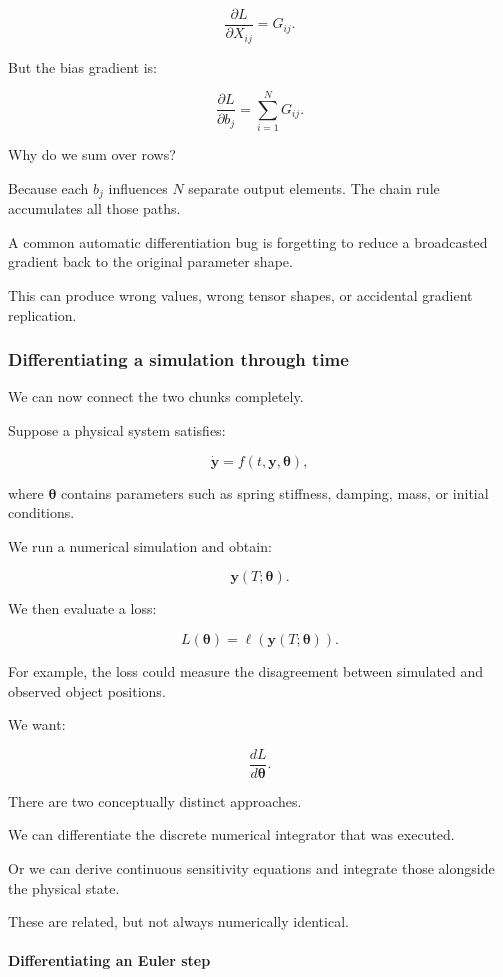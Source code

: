 \[
\frac{\partial L}{\partial X_{ij}}=G_{ij}.
\]

But the bias gradient is:

\[
\boxed{ \frac{\partial L}{\partial b_j} = \sum_{i=1}^{N}G_{ij} }.
\]

Why do we sum over rows?

Because each \(b_j\) influences \(N\) separate output elements. The chain rule accumulates all those paths.

A common automatic differentiation bug is forgetting to reduce a broadcasted gradient back to the original parameter shape.

This can produce wrong values, wrong tensor shapes, or accidental gradient replication.

\subsubsection{Differentiating a simulation through time}\label{differentiating-a-simulation-through-time}

We can now connect the two chunks completely.

Suppose a physical system satisfies:

\[
\dot{\mathbf y}=f(t,\mathbf y,\boldsymbol\theta),
\]

where \(\boldsymbol\theta\) contains parameters such as spring stiffness, damping, mass, or initial conditions.

We run a numerical simulation and obtain:

\[
\mathbf y(T;\boldsymbol\theta).
\]

We then evaluate a loss:

\[
L(\boldsymbol\theta) = \ell(\mathbf y(T;\boldsymbol\theta)).
\]

For example, the loss could measure the disagreement between simulated and observed object positions.

We want:

\[
\boxed{\frac{dL}{d\boldsymbol\theta}}.
\]

There are two conceptually distinct approaches.

We can differentiate the discrete numerical integrator that was executed.

Or we can derive continuous sensitivity equations and integrate those alongside the physical state.

These are related, but not always numerically identical.

\paragraph{Differentiating an Euler step}\label{differentiating-an-euler-step}

